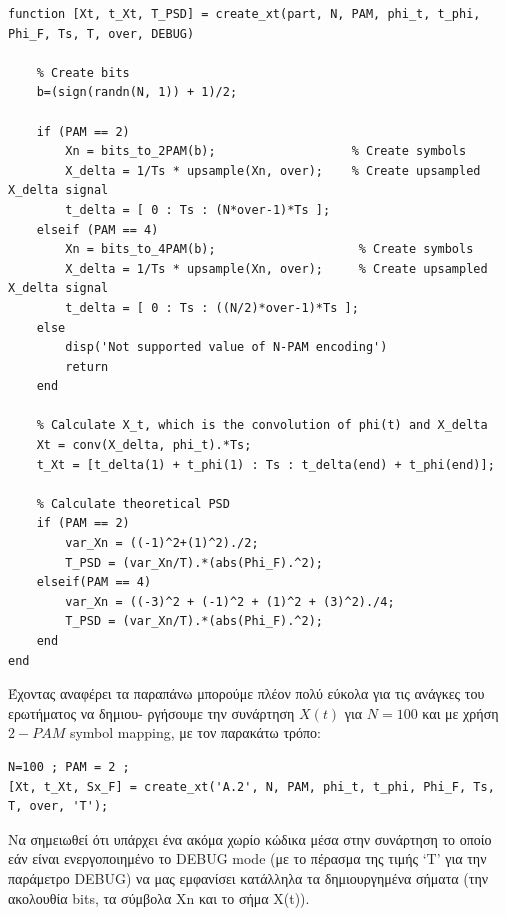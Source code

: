 \documentclass[11pt]{article}
\begin{document}
    \begin{lstlisting}[caption = {\texttt{create\_xt.m}}]
function [Xt, t_Xt, T_PSD] = create_xt(part, N, PAM, phi_t, t_phi, Phi_F, Ts, T, over, DEBUG)
    
    % Create bits
    b=(sign(randn(N, 1)) + 1)/2; 

    if (PAM == 2)
        Xn = bits_to_2PAM(b);                   % Create symbols 
        X_delta = 1/Ts * upsample(Xn, over);    % Create upsampled X_delta signal              
        t_delta = [ 0 : Ts : (N*over-1)*Ts ];
    elseif (PAM == 4)
        Xn = bits_to_4PAM(b);                    % Create symbols
        X_delta = 1/Ts * upsample(Xn, over);     % Create upsampled X_delta signal            
        t_delta = [ 0 : Ts : ((N/2)*over-1)*Ts ];
    else
        disp('Not supported value of N-PAM encoding')
        return
    end
    
    % Calculate X_t, which is the convolution of phi(t) and X_delta
    Xt = conv(X_delta, phi_t).*Ts;
    t_Xt = [t_delta(1) + t_phi(1) : Ts : t_delta(end) + t_phi(end)];
    
    % Calculate theoretical PSD
    if (PAM == 2)
        var_Xn = ((-1)^2+(1)^2)./2;
        T_PSD = (var_Xn/T).*(abs(Phi_F).^2);
    elseif(PAM == 4)
        var_Xn = ((-3)^2 + (-1)^2 + (1)^2 + (3)^2)./4;
        T_PSD = (var_Xn/T).*(abs(Phi_F).^2);
    end
end
    \end{lstlisting}
    
    \par \noindent
    Έχοντας αναφέρει τα παραπάνω μπορούμε πλέον πολύ εύκολα για τις ανάγκες του ερωτήματος να δημιου- ργήσουμε την συνάρτηση $X(t)$ για $Ν=100$ και με χρήση $2-PAM$ symbol mapping, με τον παρακάτω τρόπο:
    
    \begin{lstlisting}[caption = {\texttt{Α.2 Create X(t)}}]
N=100 ; PAM = 2 ;
[Xt, t_Xt, Sx_F] = create_xt('A.2', N, PAM, phi_t, t_phi, Phi_F, Ts, T, over, 'T');  
    \end{lstlisting}
    
    \par \noindent
    Να σημειωθεί ότι υπάρχει ένα ακόμα χωρίο κώδικα μέσα στην συνάρτηση το οποίο εάν είναι ενεργοποιημένο το DEBUG mode (με το πέρασμα της τιμής `Τ' για την παράμετρο DEBUG) να μας εμφανίσει κατάλληλα τα δημιουργημένα σήματα (την ακολουθία bits, τα σύμβολα Xn και το σήμα X(t)). 
    
\end{document}
